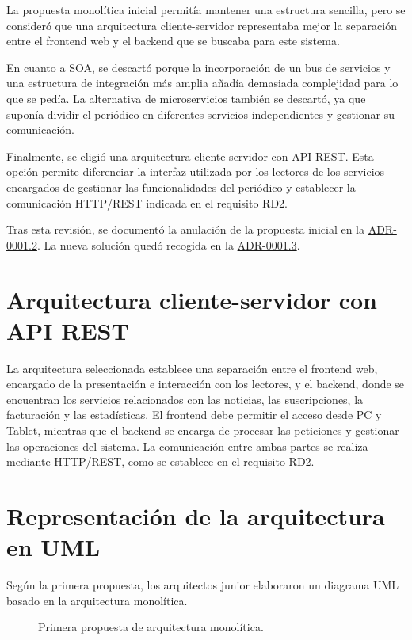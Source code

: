 La propuesta monolítica inicial permitía mantener una estructura sencilla, pero se consideró que una arquitectura cliente-servidor representaba mejor la separación entre el frontend web y el backend que se buscaba para este sistema.

En cuanto a SOA, se descartó porque la incorporación de un bus de servicios y una estructura de integración más amplia añadía demasiada complejidad para lo que se pedía. La alternativa de microservicios también se descartó, ya que suponía dividir el periódico en diferentes servicios independientes y gestionar su comunicación.

Finalmente, se eligió una arquitectura cliente-servidor con API REST. Esta opción permite diferenciar la interfaz utilizada por los lectores de los servicios encargados de gestionar las funcionalidades del periódico y establecer la comunicación HTTP/REST indicada en el requisito RD2.

Tras esta revisión, se documentó la anulación de la propuesta inicial en la \href{Decisiones/0001.2-anulacion-decision-0001.1.md}{ADR-0001.2}. La nueva solución quedó recogida en la \href{Decisiones/0001.3-migracion-estilo-cliente-servidor-api-rest.md}{ADR-0001.3}.

\section{Arquitectura cliente-servidor con API REST}

La arquitectura seleccionada establece una separación entre el frontend web, encargado de la presentación e interacción con los lectores, y el backend, donde se encuentran los servicios relacionados con las noticias, las suscripciones, la facturación y las estadísticas. El frontend debe permitir el acceso desde PC y Tablet, mientras que el backend se encarga de procesar las peticiones y gestionar las operaciones del sistema. La comunicación entre ambas partes se realiza mediante HTTP/REST, como se establece en el requisito RD2.

\section{Representación de la arquitectura en UML}

Según la primera propuesta, los arquitectos junior elaboraron un diagrama UML basado en la arquitectura monolítica.

\begin{landscape}
\begin{figure}[p]
    \centering
    
    \caption{Primera propuesta de arquitectura monolítica.}
    \label{fig:arquitectura-monolitica}
\end{figure}
\end{landscape}

